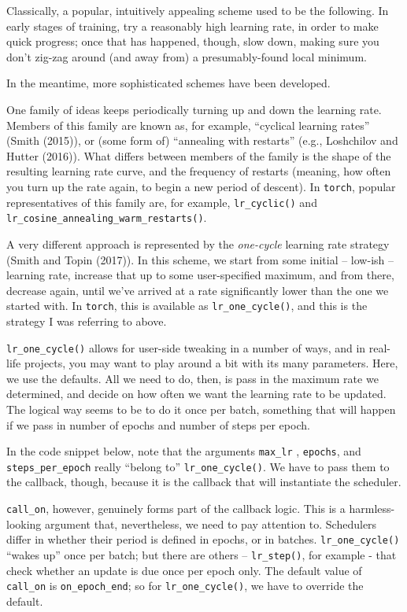 \documentclass[
  letterpaper,
]{krantz}
\begin{document}
Classically, a popular, intuitively appealing scheme used to be the
following. In early stages of training, try a reasonably high learning
rate, in order to make quick progress; once that has happened, though,
slow down, making sure you don't zig-zag around (and away from) a
presumably-found local minimum.

In the meantime, more sophisticated schemes have been developed.

One family of ideas keeps periodically turning up and down the learning
rate. Members of this family are known as, for example, ``cyclical
learning rates'' (Smith (2015)), or (some form of) ``annealing with
restarts'' (e.g., Loshchilov and Hutter (2016)). What differs between
members of the family is the shape of the resulting learning rate curve,
and the frequency of restarts (meaning, how often you turn up the rate
again, to begin a new period of descent). In \texttt{torch}, popular
representatives of this family are, for example, \texttt{lr\_cyclic()}
and \texttt{lr\_cosine\_annealing\_warm\_restarts()}.

A very different approach is represented by the \emph{one-cycle}
learning rate strategy (Smith and Topin (2017)). In this scheme, we
start from some initial -- low-ish -- learning rate, increase that up to
some user-specified maximum, and from there, decrease again, until we've
arrived at a rate significantly lower than the one we started with. In
\texttt{torch}, this is available as \texttt{lr\_one\_cycle()}, and this
is the strategy I was referring to above.

\texttt{lr\_one\_cycle()} allows for user-side tweaking in a number of
ways, and in real-life projects, you may want to play around a bit with
its many parameters. Here, we use the defaults. All we need to do, then,
is pass in the maximum rate we determined, and decide on how often we
want the learning rate to be updated. The logical way seems to be to do
it once per batch, something that will happen if we pass in number of
epochs and number of steps per epoch.

In the code snippet below, note that the arguments \texttt{max\_lr} ,
\texttt{epochs}, and \texttt{steps\_per\_epoch} really ``belong to''
\texttt{lr\_one\_cycle()}. We have to pass them to the callback, though,
because it is the callback that will instantiate the scheduler.

\texttt{call\_on}, however, genuinely forms part of the callback logic.
This is a harmless-looking argument that, nevertheless, we need to pay
attention to. Schedulers differ in whether their period is defined in
epochs, or in batches. \texttt{lr\_one\_cycle()} ``wakes up'' once per
batch; but there are others -- \texttt{lr\_step()}, for example - that
check whether an update is due once per epoch only. The default value of
\texttt{call\_on} is \texttt{on\_epoch\_end}; so for
\texttt{lr\_one\_cycle()}, we have to override the default.
\end{document}
